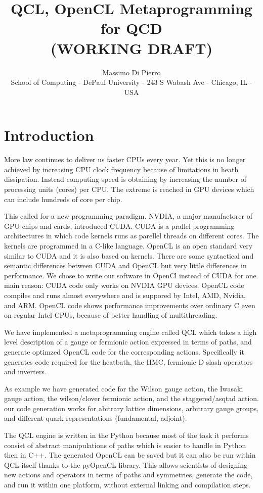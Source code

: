 \documentclass[12pt]{article}
\title{QCL, OpenCL Metaprogramming for QCD\\(WORKING DRAFT)}
\author{Massimo Di Pierro \\ \footnotesize{School of Computing - DePaul University - 243 S Wabash Ave - Chicago, IL - USA}}
\begin{document}
\maketitle
\begin{abstract}
\end{abstract}

\section{Introduction}

More law continues to deliver us faster CPUs every year. Yet this is no longer achieved by increasing CPU clock frequency because of limitations in heath dissipation. Instead computing speed is obtaining by increasing the number of processing units (cores) per CPU. The extreme is reached in GPU devices which can include hundreds of core per chip.

This called for a new programming paradigm. NVDIA, a major manufactorer of GPU chips and cards, introduced CUDA. CUDA is a prallel programming architectures in which code kernels runs as parellel threads on different cores. The kernels are programmed in a C-like language. OpenCL is an open standard very similar to CUDA and it is also based on kernels. There are some syntactical and semantic differences between CUDA and OpenCL but very little differences in performance. We chose to write our software in OpenCl instead of CUDA for one main reason: CUDA code only works on NVDIA GPU devices. OpenCL code compiles and runs almost everywhere and is suppored by Intel, AMD, Nvidia, and ARM. OpenCL code shows performance improvements over ordinary C even on regular Intel CPUs, because of better handling of multithreading.

We have implemented a metaprogramming engine called QCL which takes a high level description of a gauge or fermionic action expressed in terms of paths, and generate optimzed OpenCL code for the corresponding actions. Specifically it generates code required for the heatbath, the HMC, fermionic D slash operators and inverters.

As example we have generated code for the Wilson gauge action, the Iwasaki gauge action, the wilson/clover fermionic action, and the staggered/asqtad action. our code generation works for abitrary lattice dimensions, arbitrary gauge groups, and different quark representations (fundamental, adjoint).

The QCL engine is written in the Python because most of the task it performs consist of abstract manipulations of paths which is easier to handle in Python then in C++. The generated OpenCL can be saved but it can also be run within QCL itself thanks to the pyOpenCL library. This allows scientists of designing new actions and operators in terms of paths and symmetries, generate the code, and run it within one platform, without external linking and compilation steps.
\end{document}
